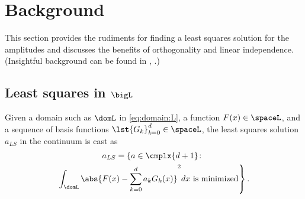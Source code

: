 \documentclass[conference]{worldcomp}
\begin{document}
\section{Background}

This section provides the rudiments for finding a least squares solution for the amplitudes and discusses the benefits of orthogonality and linear independence. (Insightful background can be found in \cite[\S 4.6, \S 5.13]{Meyer}, \cite[ch 8]{Laub}.)
 
\subsection{Least squares in $\bigL$}
Given a domain such as $\domL$ in \eqref{eq:domain:L}, a function $F(x)\in\spaceL$, and a sequence of basis functions $\lst{G_{k}}_{k=0}^{d}\in\spaceL$, the least squares solution $a_{LS}$ in the continuum is cast as
  \begin{multline}
    a_{LS} = \left\{ a\in\cmplx{d + 1} \colon \right. \\
    \left. \int_{\domL}{ \abs{F(x)-\sum_{k=0}^{d}a_{k} G_{k}(x)}^{2} dx } \text{ is minimized}
    \right\}.
    \label{eq:L:lsq}
  \end{multline}
  
\end{document}
